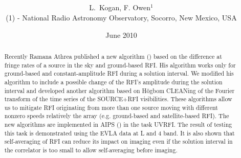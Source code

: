 \documentclass{article}
\title{
   \vskip -35pt
   \fbox{{\large\whatmem}} \\
   \vskip 28pt
   \memtit \\}
\author{ L.~Kogan, F. Owen$^1$
\vspace{2 mm}\\
\small (1) - National Radio Astronomy Observatory, Socorro, New Mexico,
USA\\}
\date{June 2010}
\begin{document}
\maketitle

\vspace{5mm}
\begin{abstract}
Recently Ramana Athrea published a new algorithm (\cite{ram}) based
on the difference at fringe rates of a source in the sky and ground-based
RFI. His algorithm works only for ground-based and constant-amplitude RFI
 during a solution interval. We modified
his algorithm to include a possible change of the RFI's amplitude
during the solution interval and developed another algorithm based on
H\"{o}gbom CLEANing of the Fourier transform of the time series of the
SOURCE+RFI visibilities. These
algorithms allow us to mitigate RFI originating from more than one
source moving with different nonzero speeds relatively the array
(e.g. ground-based and satellite-based RFI). The new algorithms are
implemented in AIPS
(\cite{aip}) in the task UVRFI. The result of testing this task is
demonstrated using the EVLA data at L and 4 band. It is also shown that
self-averaging of RFI can reduce its impact on imaging even if the solution
interval in the correlator is too small to allow self-averaging before imaging.
\end{abstract}
\end{document}

